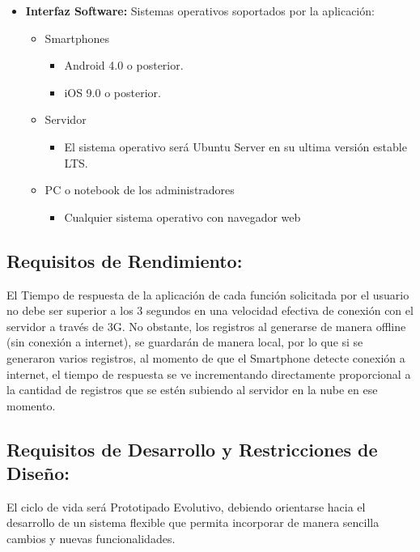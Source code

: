 \begin{itemize}
        \item \textbf{Interfaz Software:} 
          Sistemas operativos soportados por la aplicación:
          \begin{itemize}
            \item Smartphones 
            \begin{itemize}
              \item Android 4.0 o posterior.
              \item iOS 9.0 o posterior.
            \end{itemize}
            \item Servidor 
            \begin{itemize}
              \item  El sistema operativo será Ubuntu Server en su ultima versión estable LTS. 
            \end{itemize}
            \item PC o notebook de los administradores 
            \begin{itemize}
              \item Cualquier sistema operativo con navegador web 
            \end{itemize} 
          \end{itemize}
      \end{itemize}

    \subsection{Requisitos de Rendimiento:}

      El Tiempo de respuesta de la aplicación de cada función solicitada por el usuario no debe ser superior a los 3 segundos en una velocidad efectiva de conexión con el servidor a través de 3G.
      No obstante, los registros al generarse de manera offline (sin conexión a internet), se guardarán de manera local, por lo que si se generaron varios registros, al momento de que el Smartphone detecte conexión a internet, el tiempo de respuesta se ve incrementando directamente proporcional a la cantidad de registros que se estén subiendo al servidor en la nube en ese momento.

    \subsection{Requisitos de Desarrollo y Restricciones de Diseño:}

      El ciclo de vida será Prototipado Evolutivo, debiendo orientarse hacia el desarrollo de un sistema flexible que permita incorporar de manera sencilla cambios y nuevas funcionalidades.


